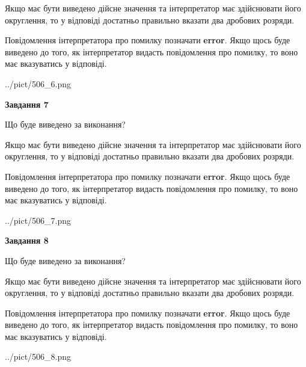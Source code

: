 \documentclass[12pt, ukrainian]{article}
\begin{document}
{\begin {Large}
Якщо має бути виведено дійсне значення та інтерпретатор має здійснювати його округлення, 
то у відповіді достатньо правильно вказати два дробових розряди.

Повідомлення інтерпретатора про помилку позначати \textbf{error}.
Якщо щось буде виведено до того, як інтерпретатор видасть повідомлення про помилку, 
то воно має вказуватись у відповіді. \par

\begin{center}
	{../pict/506_6.png}
\end{center}
\newpage

{\begin {center}\textbf{Завдання 7}\end {center}}\par
Що буде виведено за виконання? \par

Якщо має бути виведено дійсне значення та інтерпретатор має здійснювати його округлення, 
то у відповіді достатньо правильно вказати два дробових розряди.

Повідомлення інтерпретатора про помилку позначати \textbf{error}.
Якщо щось буде виведено до того, як інтерпретатор видасть повідомлення про помилку, 
то воно має вказуватись у відповіді. \par

\begin{center}
	{../pict/506_7.png}
\end{center}
\newpage

{\begin {center}\textbf{Завдання 8}\end {center}}\par
Що буде виведено за виконання? \par

Якщо має бути виведено дійсне значення та інтерпретатор має здійснювати його округлення, 
то у відповіді достатньо правильно вказати два дробових розряди.

Повідомлення інтерпретатора про помилку позначати \textbf{error}.
Якщо щось буде виведено до того, як інтерпретатор видасть повідомлення про помилку, 
то воно має вказуватись у відповіді. \par

\begin{center}
	{../pict/506_8.png}
\end{center}
\newpage


\end{Large}}
\end{document}
